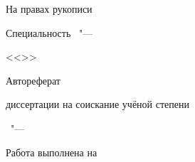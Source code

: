 {\footnotesize
\thispagestyle{empty}

\begin{center}%
\MakeUppercase{\thesisOrganization}
\end{center}%

\vspace{0pt plus1fill} %
\begin{flushright}
  \large{На правах рукописи}
\end{flushright}

\vspace{0pt plus3fill} %
\begin{center}
\textbf {\large \thesisAuthor}
\end{center}

\vspace{0pt plus3fill} %
\begin{center}
\textbf {\Large \thesisTitle}

\vspace{0pt plus3fill} %
{\large Специальность \thesisSpecialtyNumber\ "---\par <<\thesisSpecialtyTitle>>}

\vspace{0pt plus1.5fill} %
\Large{Автореферат}\par
\large{диссертации на соискание учёной степени\par \thesisDegree}
\end{center}

\vspace{0pt plus4fill} %
\begin{center}
{\large{\thesisCity\ "--- \thesisYear}}
\end{center}

\newpage
\thispagestyle{empty}
\noindent Работа выполнена на \thesisInOrganization

}

